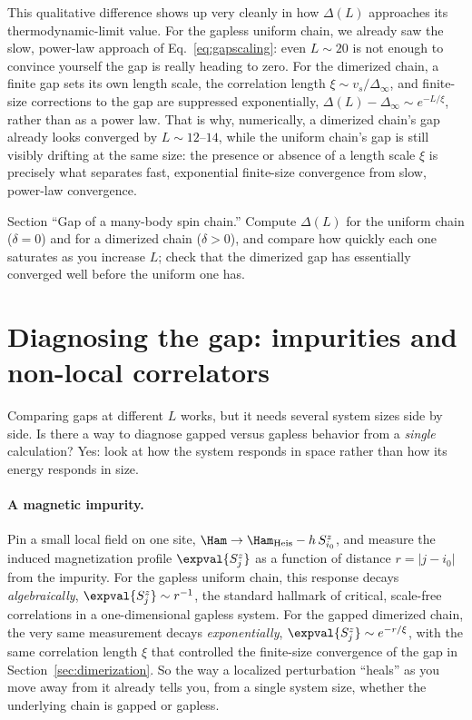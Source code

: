 \documentclass[all_sessions.tex]{subfiles}
\begin{document}
This qualitative difference shows up very cleanly in how $\Delta(L)$ approaches its thermodynamic-limit
value. For the gapless uniform chain, we already saw the slow, power-law approach of
Eq.~\eqref{eq:gapscaling}: even $L\sim20$ is not enough to convince yourself the gap is really heading to
zero. For the dimerized chain, a finite gap sets its own length scale, the correlation length
$\xi\sim v_s/\Delta_\infty$, and finite-size corrections to the gap are suppressed exponentially,
$\Delta(L)-\Delta_\infty \sim e^{-L/\xi}$, rather than as a power law. That is why, numerically, a
dimerized chain's gap already looks converged by $L\sim12$--$14$, while the uniform chain's gap is still
visibly drifting at the same size: the presence or absence of a length scale $\xi$ is precisely what
separates fast, exponential finite-size convergence from slow, power-law convergence.

\begin{notebook}
Section ``Gap of a many-body spin chain.'' Compute $\Delta(L)$ for the uniform chain ($\delta=0$)
and for a dimerized chain ($\delta>0$), and compare how quickly each one saturates as you increase
$L$; check that the dimerized gap has essentially converged well before the uniform one has.
\end{notebook}

\section{Diagnosing the gap: impurities and non-local correlators}
\label{sec:diagnostics}
Comparing gaps at different $L$ works, but it needs several system sizes side by side. Is there a way
to diagnose gapped versus gapless behavior from a \emph{single} calculation? Yes: look at how the system
responds in space rather than how its energy responds in size.

\paragraph{A magnetic impurity.} Pin a small local field on one site, $\Ham\to\Ham_{\mathrm{Heis}} - h\,
S_{i_0}^z$, and measure the induced magnetization profile $\expval{S_j^z}$ as a function of distance
$r=|j-i_0|$ from the impurity. For the gapless uniform chain, this response decays \emph{algebraically},
$\expval{S_j^z}\sim r^{-1}$, the standard hallmark of critical, scale-free correlations in a
one-dimensional gapless system. For the gapped dimerized chain, the very same measurement decays
\emph{exponentially}, $\expval{S_j^z}\sim e^{-r/\xi}$, with the same correlation length $\xi$ that
controlled the finite-size convergence of the gap in Section~\ref{sec:dimerization}. So the way a
localized perturbation ``heals'' as you move away from it already tells you, from a single system size,
whether the underlying chain is gapped or gapless.
\end{document}
